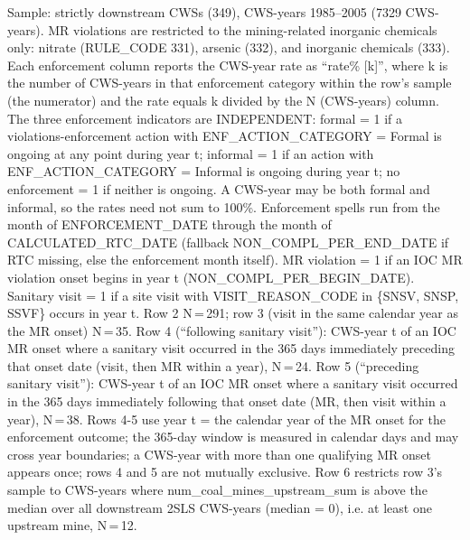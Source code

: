 \begin{table}[htbp]
{Sample: strictly downstream CWSs (349), CWS-years 1985--2005 (7329 CWS-years). MR violations are restricted to the mining-related inorganic chemicals only: nitrate (RULE\_CODE 331), arsenic (332), and inorganic chemicals (333). Each enforcement column reports the CWS-year rate as ``rate\% [k]'', where k is the number of CWS-years in that enforcement category within the row's sample (the numerator) and the rate equals k divided by the N (CWS-years) column. The three enforcement indicators are INDEPENDENT: formal = 1 if a violations-enforcement action with ENF\_ACTION\_CATEGORY = Formal is ongoing at any point during year t; informal = 1 if an action with ENF\_ACTION\_CATEGORY = Informal is ongoing during year t; no enforcement = 1 if neither is ongoing. A CWS-year may be both formal and informal, so the rates need not sum to 100\%. Enforcement spells run from the month of ENFORCEMENT\_DATE through the month of CALCULATED\_RTC\_DATE (fallback NON\_COMPL\_PER\_END\_DATE if RTC missing, else the enforcement month itself). MR violation = 1 if an IOC MR violation onset begins in year t (NON\_COMPL\_PER\_BEGIN\_DATE). Sanitary visit = 1 if a site visit with VISIT\_REASON\_CODE in \{SNSV, SNSP, SSVF\} occurs in year t. Row 2 N\,=\,291; row 3 (visit in the same calendar year as the MR onset) N\,=\,35. Row 4 (``following sanitary visit''): CWS-year t of an IOC MR onset where a sanitary visit occurred in the 365 days immediately preceding that onset date (visit, then MR within a year), N\,=\,24. Row 5 (``preceding sanitary visit''): CWS-year t of an IOC MR onset where a sanitary visit occurred in the 365 days immediately following that onset date (MR, then visit within a year), N\,=\,38. Rows 4-5 use year t = the calendar year of the MR onset for the enforcement outcome; the 365-day window is measured in calendar days and may cross year boundaries; a CWS-year with more than one qualifying MR onset appears once; rows 4 and 5 are not mutually exclusive. Row 6 restricts row 3's sample to CWS-years where num\_coal\_mines\_upstream\_sum is above the median over all downstream 2SLS CWS-years (median = 0), i.e. at least one upstream mine, N\,=\,12.
}
\end{table}

